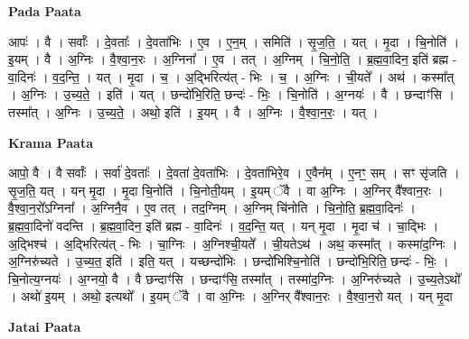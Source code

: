 \documentclass[17pt]{extarticle}
\begin{document}
\textbf{Pada Paata} \newline

आपः॑ । वै । सर्वाः᳚ । दे॒वताः᳚ । दे॒वता॑भिः । ए॒व । ए॒न॒म् । समिति॑ । सृ॒ज॒ति॒ । यत् । मृ॒दा । चि॒नोति॑ । इ॒यम् । वै । अ॒ग्निः । वै॒श्वा॒न॒रः । अ॒ग्निना᳚ । ए॒व । तत् । अ॒ग्निम् । चि॒नो॒ति॒ । ब्र॒ह्म॒वा॒दिन॒ इति॑ ब्रह्म - वा॒दिनः॑ । व॒द॒न्ति॒ । यत् । मृ॒दा । च॒ । अ॒द्भिरित्य॑त् - भिः । च॒ । अ॒ग्निः । ची॒यते᳚ । अथ॑ । कस्मा᳚त् । अ॒ग्निः । उ॒च्य॒ते॒ । इति॑ । यत् । छन्दो॑भि॒रिति॒ छन्दः॑ - भिः॒ । चि॒नोति॑ । अ॒ग्नयः॑ । वै । छन्दाꣳ॑सि । तस्मा᳚त् । अ॒ग्निः । उ॒च्य॒ते॒ । अथो॒ इति॑ । इ॒यम् । वै । अ॒ग्निः । वै॒श्वा॒न॒रः॒ । यत् ।  \newline


\textbf{Krama Paata} \newline

आपो॒ वै । वै सर्वाः᳚ । सर्वा॑ दे॒वताः᳚ । दे॒वता॑ दे॒वता॑भिः । दे॒वता॑भिरे॒व । ए॒वैन᳚म् । ए॒नꣳ॒॒ सम् । सꣳ सृ॑जति । सृ॒ज॒ति॒ यत् । यन् मृ॒दा । मृ॒दा चि॒नोति॑ । चि॒नोती॒यम् । इ॒यम् ॅवै । वा अ॒ग्निः । अ॒ग्निर् वै᳚श्वान॒रः । वै॒श्वा॒न॒रो᳚ऽग्निना᳚ । अ॒ग्निनै॒व । ए॒व तत् । तद॒ग्निम् । अ॒ग्निम् चि॑नोति । चि॒नो॒ति॒ ब्र॒ह्म॒वा॒दिनः॑ । ब्र॒ह्म॒वा॒दिनो॑ वदन्ति । ब्र॒ह्म॒वा॒दिन॒ इति॑ ब्रह्म - वा॒दिनः॑ । व॒द॒न्ति॒ यत् । यन् मृ॒दा । मृ॒दा च॑ । चा॒द्भिः । अ॒द्भिश्च॑ । अ॒द्भिरित्य॑त् - भिः । चा॒ग्निः । अ॒ग्निश्ची॒यते᳚ । ची॒यतेऽथ॑ । अथ॒ कस्मा᳚त् । कस्मा॑द॒ग्निः । अ॒ग्निरु॑च्यते । उ॒च्य॒त॒ इति॑ । इति॒ यत् । यच्छन्दो॑भिः । छन्दो॑भिश्चि॒नोति॑ । छन्दो॑भि॒रिति॒ छन्दः॑ - भिः॒ । चि॒नोत्य॒ग्नयः॑ । अ॒ग्नयो॒ वै । वै छन्दाꣳ॑सि । छन्दाꣳ॑सि॒ तस्मा᳚त् । तस्मा॑द॒ग्निः । अ॒ग्निरु॑च्यते । उ॒च्य॒तेऽथो᳚ । अथो॑ इ॒यम् । अथो॒ इत्यथो᳚ । इ॒यम् ॅवै । वा अ॒ग्निः । अ॒ग्निर् वै᳚श्वान॒रः । वै॒श्वा॒न॒रो यत् । यन् मृ॒दा \newline

\textbf{Jatai Paata} \newline
\end{document}

